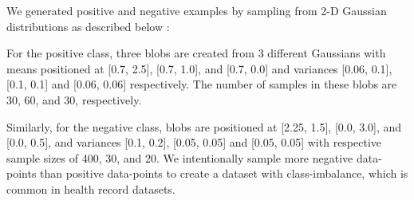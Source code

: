 We generated positive and negative examples by sampling from 2-D Gaussian distributions as described below : 

For the positive class, three blobs are created from 3 different Gaussians with means positioned at [0.7, 2.5], [0.7, 1.0], and [0.7, 0.0] and variances [0.06, 0.1], [0.1, 0.1] and [0.06, 0.06] respectively. The number of samples in these blobs are 30, 60, and 30, respectively.

Similarly, for the negative class, blobs are positioned at [2.25, 1.5], [0.0, 3.0], and [0.0, 0.5], and variances [0.1, 0.2], [0.05, 0.05] and [0.05, 0.05] with respective sample sizes of 400, 30, and 20. We intentionally sample more negative data-points than positive data-points to create a dataset with class-imbalance, which is common in health record datasets.